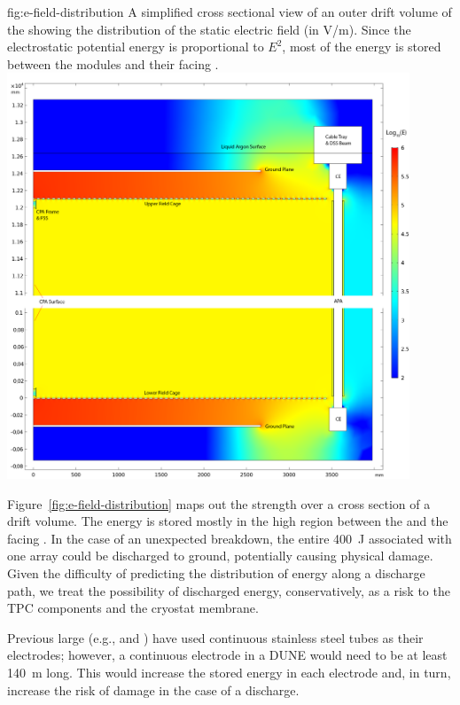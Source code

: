 \begin{dunefigure}
{fig:e-field-distribution}
{A simplified cross sectional view of an outer drift volume of the  showing the distribution of the static electric field (in V/m).  Since the electrostatic potential energy is proportional to $E^2$, most of the energy is stored between the  modules and their facing .   }
\centering
\includegraphics[width=0.9\textwidth]{graphics/E_Field_Distribution.png} 
\end{dunefigure}

Figure~\ref{fig:e-field-distribution} maps out the \efield strength over a cross section of a drift volume.  
The energy is stored mostly in the high \efield{} region between the  and the facing .  In the case of an unexpected  breakdown, the entire \SI{400}{J} associated with one  array could be discharged to ground,
potentially causing physical damage.
Given the difficulty of predicting the distribution of energy along a discharge path, we treat the possibility of discharged energy, conservatively, as a risk to the TPC components and the cryostat membrane. 

Previous large  (e.g.,  and ) have used continuous stainless steel tubes as their  electrodes;
however, a continuous electrode in a DUNE  would need to be at least \SI{140}{\m} long. This would increase the stored energy in each electrode and, in turn, increase the risk of damage in the case of a discharge. 

